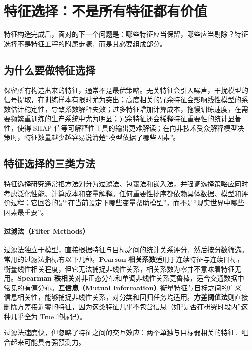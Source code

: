 \section{特征选择：不是所有特征都有价值}

特征构造完成后，面对的下一个问题是：哪些特征应当保留，哪些应当剔除？特征选择不是特征工程的附属步骤，而是其必要组成部分。

\subsection{为什么要做特征选择}

保留所有构造出来的特征，通常不是最优策略。无关特征会引入噪声，干扰模型的信号提取，在训练样本有限时尤为突出；高度相关的冗余特征会影响线性模型的系数估计稳定性，导致系数解释失效；过多特征增加计算成本，拖慢训练速度，在需要频繁重训练的生产系统中尤为明显；冗余特征还会稀释特征重要性的统计显著性，使得 SHAP 值等可解释性工具的输出更难解读；在向非技术受众解释模型决策时，特征数量越少越容易说清楚“模型依据了哪些因素”。

\subsection{特征选择的三类方法}

特征选择研究通常把方法划分为过滤法、包裹法和嵌入法，并强调选择策略应同时考虑泛化性能、计算成本和变量解释\cite{guyon2003introduction}。任何重要性排序都依赖具体数据、模型和评价过程；它回答的是“在当前设定下哪些变量帮助模型”，而不是“现实世界中哪些因素最重要”。

\paragraph{过滤法（Filter Methods）}

过滤法独立于模型，直接根据特征与目标之间的统计关系评分，然后按分数筛选。常用的过滤法指标有以下几种。\textbf{Pearson 相关系数}适用于连续特征与连续目标，衡量线性相关程度，但它无法捕捉非线性关系，相关系数为零并不意味着特征无用。\textbf{Spearman 秩相关}对非正态分布和单调非线性关系更鲁棒，适合交通数据中常见的有偏分布。\textbf{互信息（Mutual Information）}衡量特征与目标之间的广义信息相关性，能够捕捉非线性关系，对分类和回归任务均适用。\textbf{方差阈值法}则直接删除方差接近零的特征，因为这类特征几乎不包含信息（如“是否在研究时段内”这种几乎全为 True 的标记）。

过滤法速度快，但忽略了特征之间的交互效应：两个单独与目标弱相关的特征，组合起来可能具有强预测力。

